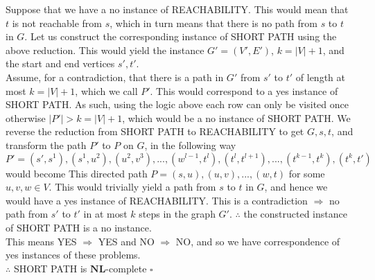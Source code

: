 \documentclass[12pt]{article}
\begin{document}
\begin{enumerate}
\begin{enumerate}
Suppose that we have a no instance of REACHABILITY. This would mean that $t$ is not reachable from $s$, which in turn means that there is no path from $s$ to $t$ in $G$. Let us construct the corresponding instance of SHORT PATH using the above reduction. This would yield the instance $G'=(V',E')$, $k=|V|+1$, and the start and end vertices $s',t'$. \\
Assume, for a contradiction, that there is a path in $G'$ from $s'$ to $t'$ of length at most $k=|V|+1$, which we call $P'$. This would correspond to a yes instance of SHORT PATH. As such, using the logic above each row can only be visited once otherwise $|P'|>k=|V|+1$, which would be a no instance of SHORT PATH. We reverse the reduction from SHORT PATH to REACHABILITY to get $G,s,t$, and transform the path $P'$ to $P$ on $G$, in the following way $P'=(s',s^1),(s^1,u^2),(u^2,v^3),...,(w^{l-1},t^l),(t^l,t^{l+1}),...,(t^{k-1},t^k),(t^k,t')$ would become This directed path $P=(s,u),(u,v),...,(w,t)$ for some $u,v,w \in V$. This would trivially yield a path from $s$ to $t$ in $G$, and hence we would have a yes instance of REACHABILITY. This is a contradiction $\Rightarrow$  no path from $s'$ to $t'$ in at most $k$ steps in the graph $G'$. $\therefore$ the constructed instance of SHORT PATH is a no instance.\\
This means YES $\Rightarrow$ YES and NO $\Rightarrow$ NO, and so we have correspondence of yes instances of these problems. \\$\therefore$ SHORT PATH is $\textbf{NL}$-complete $\square $


\end{enumerate}
\end{enumerate}
\end{document}
